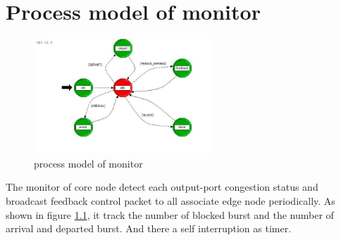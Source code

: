\documentclass[oneside,12pt]{CUEDthesisPSnPDF}
\begin{document}
\renewcommand{\thepage}{\mbox{A-\arabic{page}}}
\renewcommand\thechapter{\Alph{chapter}}
\renewcommand{\chaptername}{Appendix}
\renewcommand{\thefigure}{A-\arabic{chapter}.\arabic{figure}}
\renewcommand{\thetable}{A-\arabic{chapter}.\arabic{table}}
\setcounter{page}{22}
\addtocounter{chapter}{2}

\chapter{Process model of monitor}
\thispagestyle{fancy}
\begin{figure}[!htb]
\centering
\includegraphics[width=2.6in]{fig/monitor}
\caption{process model of monitor}
\label{fig:monitor}
\end{figure}

The monitor of core node detect each output-port congestion status and broadcast feedback control packet to all associate edge node periodically. As shown in figure \ref{fig:monitor}, it track the number of blocked burst and the number of arrival and departed burst. And there a self interruption as timer.  
\end{document}
